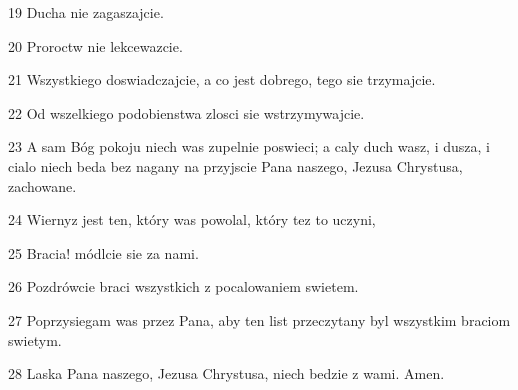 \par 19 Ducha nie zagaszajcie.
\par 20 Proroctw nie lekcewazcie.
\par 21 Wszystkiego doswiadczajcie, a co jest dobrego, tego sie trzymajcie.
\par 22 Od wszelkiego podobienstwa zlosci sie wstrzymywajcie.
\par 23 A sam Bóg pokoju niech was zupelnie poswieci; a caly duch wasz, i dusza, i cialo niech beda bez nagany na przyjscie Pana naszego, Jezusa Chrystusa, zachowane.
\par 24 Wiernyz jest ten, który was powolal, który tez to uczyni,
\par 25 Bracia! módlcie sie za nami.
\par 26 Pozdrówcie braci wszystkich z pocalowaniem swietem.
\par 27 Poprzysiegam was przez Pana, aby ten list przeczytany byl wszystkim braciom swietym.
\par 28 Laska Pana naszego, Jezusa Chrystusa, niech bedzie z wami. Amen.


